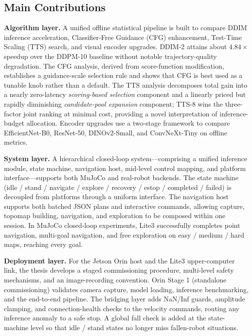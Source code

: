 \begin{digest}[en]
\subsection*{Main Contributions}

\textbf{Algorithm layer.} A unified offline statistical pipeline is built to compare
DDIM inference acceleration, Classifier-Free Guidance (CFG) enhancement, Test-Time
Scaling (TTS) search, and visual encoder upgrades. DDIM-2 attains about $4.84\times$
speedup over the DDPM-10 baseline without notable trajectory-quality degradation. The
CFG analysis, derived from score-function modification, establishes a guidance-scale
selection rule and shows that CFG is best used as a tunable knob rather than a default.
The TTS analysis decomposes total gain into a nearly zero-latency \emph{scoring-based
selection} component and a linearly priced but rapidly diminishing \emph{candidate-pool
expansion} component; TTS-8 wins the three-factor joint ranking at minimal cost,
providing a novel interpretation of inference-budget allocation. Encoder upgrades use
a two-stage framework to compare EfficientNet-B0, ResNet-50, DINOv2-Small, and
ConvNeXt-Tiny on offline metrics.

\textbf{System layer.} A hierarchical closed-loop system---comprising a unified
inference module, state machine, navigation host, mid-level control mapping, and
platform interface---supports both MuJoCo and real-robot backends. The state machine
(idle / stand / navigate / explore / recovery / estop / completed / failed) is decoupled
from platforms through a uniform interface. The navigation host supports both batched
JSON plans and interactive commands, allowing capture, topomap building, navigation,
and exploration to be composed within one session. In MuJoCo closed-loop experiments,
Lite3 successfully completes point navigation, multi-goal navigation, and free
exploration on easy / medium / hard maps, reaching every goal.

\textbf{Deployment layer.} For the Jetson Orin host and the Lite3 upper-computer link,
the thesis develops a staged commissioning procedure, multi-level safety mechanisms,
and an image-recording convention. Orin Stage 1 (standalone commissioning) validates
camera capture, model loading, inference benchmarking, and the end-to-end pipeline. The
bridging layer adds NaN/Inf guards, amplitude clamping, and connection-health checks to
the velocity commands, routing any inference anomaly to a safe stop. A global fall check
is added at the state-machine level so that idle / stand states no longer miss
fallen-robot situations.


\end{digest}

